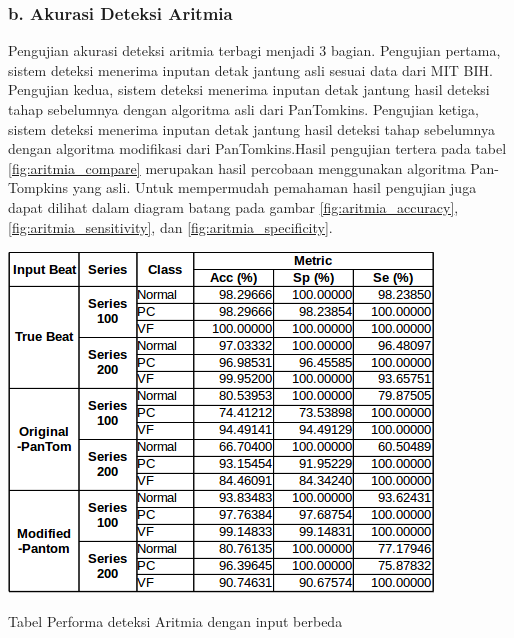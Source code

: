 \subsubsection{b. Akurasi Deteksi Aritmia}
Pengujian akurasi deteksi aritmia terbagi menjadi 3 bagian. Pengujian pertama, sistem deteksi menerima inputan detak jantung asli sesuai data dari MIT BIH. Pengujian kedua, sistem deteksi menerima inputan detak jantung hasil deteksi tahap sebelumnya dengan algoritma asli dari PanTomkins. Pengujian ketiga, sistem deteksi menerima inputan detak jantung hasil deteksi tahap sebelumnya dengan algoritma modifikasi dari PanTomkins.Hasil pengujian tertera pada tabel \ref{fig:aritmia_compare} merupakan hasil percobaan menggunakan algoritma Pan-Tompkins yang asli. Untuk mempermudah pemahaman hasil pengujian juga dapat dilihat dalam diagram batang pada gambar \ref{fig:aritmia_accuracy}, \ref{fig:aritmia_sensitivity}, dan \ref{fig:aritmia_specificity}.

\begin{table}[H]
	\centering
	\includegraphics[scale=0.7]{images/aritmia_compare.png}
	\caption{Tabel Performa deteksi Aritmia dengan input berbeda}
	\label{fig:aritmia_compare}
\end{table}

